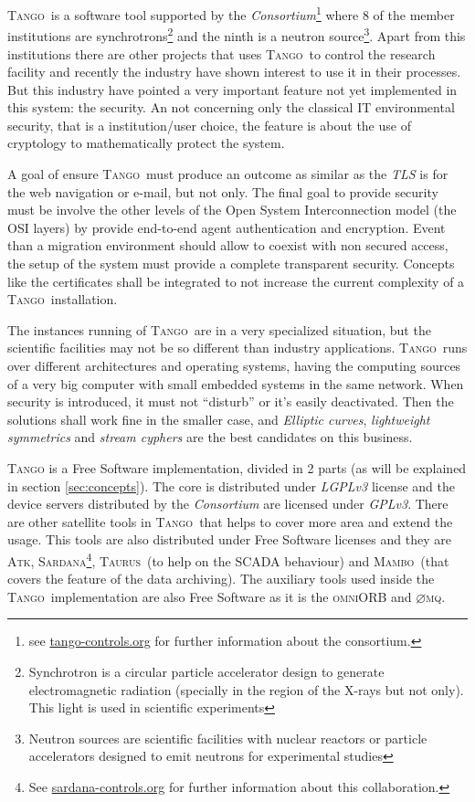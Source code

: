 \documentclass[10pt,a4paper,twoside]{llncs}
\newcommand{\tango}{\textsc{Tango}}
\newcommand{\atk}{\textsc{Atk}}
\newcommand{\sardana}{\textsc{Sardana}}
\newcommand{\taurus}{\textsc{Taurus}}
\newcommand{\mambo}{\textsc{Mambo}}
\newcommand{\omniorb}{\textsc{omniORB}}
\newcommand{\zmq}{\textsc{$\varnothing$mq}}
\begin{document}
\tango\, is a software tool supported by the \emph{Consortium}\footnote{see \href{https://www.tango-controls.org/}{tango-controls.org} for further information about the consortium.} where 8 of the member institutions are synchrotrons\footnote{Synchrotron is a circular particle accelerator design to generate electromagnetic radiation (specially in the region of the X-rays but not only). This light is used in scientific experiments} and the ninth is a neutron source\footnote{Neutron sources are scientific facilities with nuclear reactors or particle accelerators designed to emit neutrons for experimental studies}. Apart from this institutions there are other projects that uses \tango\, to control the research facility and recently the industry have shown interest to use it in their processes. But this industry have pointed a very important feature not yet implemented in this system: the security. An not concerning only the classical IT environmental security, that is a institution/user choice, the feature is 
about the use 
of cryptology to mathematically protect the 
system.

A goal of ensure \tango\, must produce an outcome as similar as the \emph{TLS} is for the web navigation or e-mail, but not only. The final goal to provide security must be involve the other levels of the Open System Interconnection model (the OSI layers) by provide end-to-end agent authentication and encryption. Event than a migration environment should allow to coexist with non secured access, the setup of the system must provide a complete transparent security. Concepts like the certificates shall be integrated to not increase the current complexity of a \tango\, installation.

The instances running of \tango\, are in a very specialized situation, but the scientific facilities may not be so different than industry applications. \tango\, runs over different architectures and operating systems, having the computing sources of a very big computer with small embedded systems in the same network. When security is introduced, it must not ``disturb'' or it's easily deactivated. Then the solutions shall work fine in the smaller case, and \emph{Elliptic curves}, \emph{lightweight symmetrics} and \emph{stream cyphers} are the best candidates on this business.

\tango\cite{tango81} is a Free Software implementation, divided in 2 parts (as will be explained in section \ref{sec:concepts}). The core is distributed under \emph{LGPLv3} license and the device servers distributed by the \emph{Consortium} are licensed under \emph{GPLv3}. There are other satellite tools in \tango\, that helps to cover more area and extend the usage. This tools are also distributed under Free Software licenses and they are \atk, \sardana\footnote{See \href{https://www.sardana-controls.org/}{sardana-controls.org} for further information about this collaboration.}, \taurus\, (to help on the SCADA behaviour) and \mambo\, (that covers the feature of the data archiving). The auxiliary tools used inside the \tango\, implementation are also Free Software as it is the \omniorb \cite{omniORB41} and \zmq \cite{zmq32}.
\end{document}
